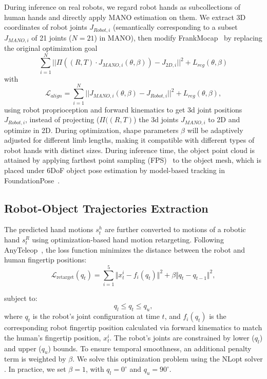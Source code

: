 \documentclass[letterpaper]{article}
\begin{document}
During inference on real robots, we regard robot hands as subcollections of human hands and directly apply MANO estimation on them. We extract 3D coordinates of robot joints $J_{Robot, i}$ (semantically corresponding to a subset $J_{MANO, i}$ of 21 joints ($N=21$) in MANO), then modify FrankMocap~\cite{rong2020frankmocap} by replacing the original optimization goal
\begin{equation*}
\sum_{i=1}^{N} || \Pi( (R, T) \cdot J_{MANO, i}(\theta, \beta) ) - J_{2D, i} ||^2 + L_{reg}(\theta, \beta)
\end{equation*}
with
\begin{equation*}
\mathcal{L}_{align} = \sum_{i=1}^{N} ||J_{MANO, i}(\theta, \beta) - J_{Robot, i} ||^2 + L_{reg}(\theta, \beta),
\end{equation*}
using robot proprioception and forward kinematics to get 3d joint positions $J_{Robot, i}$, instead of projecting ($\Pi( (R, T)$) the 3d joints $J_{MANO, i}$ to 2D and optimize in 2D. During optimization, shape parameters $\beta$ will be adaptively adjusted for different limb lengths, making it compatible with different types of robot hands with distinct sizes. During inference time, the object point cloud is attained by applying farthest point sampling (FPS)~\cite{qi2017pointnet++} to the object mesh, which is placed under 6DoF object pose estimation by model-based tracking in FoundationPose~\cite{wen2024foundationpose}.

\subsection{Robot-Object Trajectories Extraction}
The predicted hand motions $s_{t}^h$ are further converted to motions of a robotic hand $s_{t}^R$ using optimization-based hand motion retargeting. Following AnyTeleop~\cite{qin2023anyteleop}, the loss function minimizes the distance between the robot and human fingertip positions:
\begin{equation*}
    \mathcal{L}_{\text{retarget}}(q_t) = \sum_{i=1}^{5} \Vert x_t^i - f_i(q_t) \Vert^2 + \beta \Vert q_t - q_{t-1} \Vert^2,
\end{equation*}

subject to:
\begin{equation*}
    q_l \leq q_t \leq q_u,
\end{equation*}
where $q_t$ is the robot's joint configuration at time $t$, and $f_i(q_t)$ is the corresponding robot fingertip position calculated via forward kinematics to match the human's fingertip position, $x_t^i$. The robot's joints are constrained by lower ($q_l$) and upper ($q_u$) bounds. To ensure temporal smoothness, an additional penalty term is weighted by $\beta$. We solve this optimization problem using the NLopt solver \cite{qin2023anyteleop}. In practice, we set $\beta=1$, with $q_l=0^{\circ}$ and $q_u=90^{\circ}$.
\end{document}
